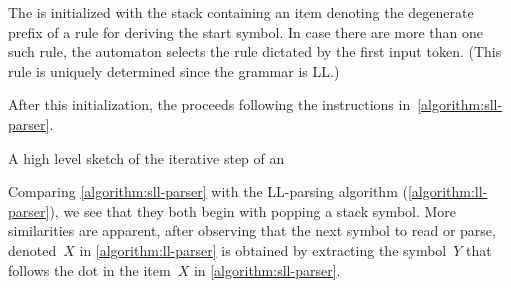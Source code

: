 The \RLLp is initialized with the stack containing an item denoting the
degenerate prefix of a rule for deriving the start symbol. In case there are
more than one such rule, the automaton selects the rule dictated by the first
input token. (This rule is uniquely determined since the grammar is LL.)

After this initialization, the \RLLp proceeds following the instructions
in~\cref{algorithm:sll-parser}.

\begin{algorithm}[h]
  \caption{\label{algorithm:sll-parser}
  A high level sketch of the iterative step of an \RLLp
}
  \begin{algorithmic}[1]
         \CONTINUE{}
      \FI
      \FI %
    \FI
      \CONTINUE{}
      \FI
    \FI
    \FI
      \CONTINUE{}
    \FI
     
  \end{algorithmic}
\end{algorithm}

Comparing \cref{algorithm:sll-parser} with the LL-parsing algorithm
(\cref{algorithm:ll-parser}), we see that they both begin with popping a stack
symbol. More similarities are apparent, after observing that the next
symbol to read or parse, denoted~$X$ in \cref{algorithm:ll-parser} is obtained
by extracting the symbol~$Y$ that follows the dot in the item~$X$ in
\cref{algorithm:sll-parser}.  

